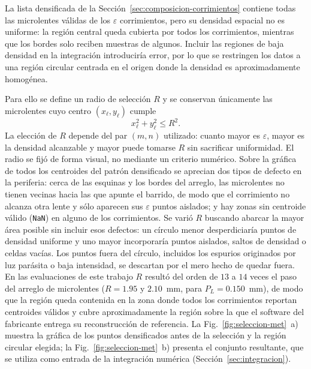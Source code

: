 \documentclass[letterpaper,12pt,oneside]{book}
\makeatletter
\renewcommand\section{\@startsection{section}{1}{\z@}{-3.5ex \@plus -1ex \@minus -.2ex}{2.3ex \@plus.2ex}{\normalfont\Large\bfseries\raggedright}}
\makeatother
\begin{document}
La lista densificada de la Sección~\ref{sec:composicion-corrimientos} contiene todas las
microlentes válidas de los $\varepsilon$ corrimientos, pero su densidad espacial no es
uniforme: la región central queda cubierta por todos los corrimientos, mientras que los
bordes solo reciben muestras de algunos. Incluir las regiones de baja densidad en la
integración introduciría error, por lo que se restringen los datos a una región circular
centrada en el origen donde la densidad es aproximadamente homogénea.

Para ello se define un radio de selección $R$ y se conservan únicamente las microlentes cuyo centro $(x_\ell, y_\ell)$ cumple
\begin{equation}
x_\ell^2 + y_\ell^2 \le R^2.
\label{eq:seleccion-circular}
\end{equation}
La elección de $R$ depende del par $(m,n)$ utilizado: cuanto mayor es $\varepsilon$, mayor es la densidad alcanzable y mayor puede tomarse $R$ sin sacrificar uniformidad. El radio se fijó de forma visual, no mediante un criterio numérico. Sobre la gráfica de todos los centroides del patrón densificado se aprecian dos tipos de defecto en la periferia: cerca de las esquinas y los bordes del arreglo, las microlentes no tienen vecinas hacia las que apunte el barrido, de modo que el corrimiento no alcanza otra lente y sólo aparecen sus $\varepsilon$ puntos aislados; y hay zonas sin centroide válido (\texttt{NaN}) en alguno de los corrimientos. Se varió $R$ buscando abarcar la mayor área posible sin incluir esos defectos: un círculo menor desperdiciaría puntos de densidad uniforme y uno mayor incorporaría puntos aislados, saltos de densidad o celdas vacías. Los puntos fuera del círculo, incluidos los espurios originados por luz parásita o baja intensidad, se descartan por el mero hecho de quedar fuera. En las evaluaciones de este trabajo $R$ resultó del orden de $13$ a $14$ veces el paso del arreglo de microlentes ($R = 1.95$ y $2.10$~mm, para $P_L = 0.150$~mm), de modo que la región queda contenida en la zona donde todos los corrimientos reportan centroides válidos y cubre aproximadamente la región sobre la que el software del fabricante entrega su reconstrucción de referencia. La Fig.~\ref{fig:seleccion-met}~a) muestra la gráfica de los puntos densificados antes de la selección y la región circular elegida; la Fig.~\ref{fig:seleccion-met}~b) presenta el conjunto resultante, que se utiliza como entrada de la integración numérica (Sección~\ref{sec:integracion}).


\section{Integración numérica}\label{sec:integracion}
\end{document}
